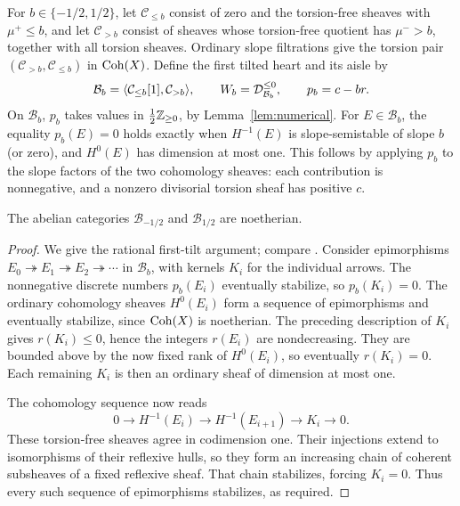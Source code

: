 For $b\in\{-1/2,1/2\}$, let $\mathcal C_{\leq b}$ consist of zero
and the torsion-free sheaves with $\mu^+\leq b$, and let
$\mathcal C_{>b}$ consist of sheaves whose torsion-free quotient has
$\mu^->b$, together with all torsion sheaves.  Ordinary slope
filtrations give the torsion pair
$(\mathcal C_{>b},\mathcal C_{\leq b})$ in $\operatorname{Coh}(X)$.  Define the
first tilted heart and its aisle by
\[
 \mathcal B_b=\langle\mathcal C_{\leq b}[1],\mathcal C_{>b}\rangle,
 \qquad W_b=\mathcal D^{\leq0}_{\mathcal B_b},
 \qquad p_b=c-br.
\]
On $\mathcal B_b$, $p_b$ takes values in $\frac12\mathbb Z_{\geq0}$, by
Lemma~\ref{lem:numerical}.  For $E\in\mathcal B_b$, the equality
$p_b(E)=0$ holds exactly when $H^{-1}(E)$ is slope-semistable of slope
$b$ (or zero), and $H^0(E)$ has dimension at most one.  This follows
by applying $p_b$ to the slope factors of the two cohomology sheaves:
each contribution is nonnegative, and a nonzero divisorial torsion
sheaf has positive $c$.

\begin{lemma}\label{lem:first-tilt-noetherian}
The abelian categories $\mathcal B_{-1/2}$ and $\mathcal B_{1/2}$ are
noetherian.
\end{lemma}

\begin{proof}
We give the rational first-tilt argument; compare
\cite[proof of Lemma~3.2.4]{BayerMacriToda2014}.
Consider epimorphisms $E_0\twoheadrightarrow E_1\twoheadrightarrow
E_2\twoheadrightarrow\cdots$ in $\mathcal B_b$, with kernels $K_i$
for the individual arrows.  The nonnegative discrete numbers
$p_b(E_i)$ eventually stabilize, so $p_b(K_i)=0$.  The ordinary
cohomology sheaves $H^0(E_i)$ form a sequence of epimorphisms and
eventually stabilize, since $\operatorname{Coh}(X)$ is noetherian.  The preceding
description of $K_i$ gives $r(K_i)\leq0$, hence the integers $r(E_i)$
are nondecreasing.  They are bounded above by the now fixed rank of
$H^0(E_i)$, so eventually $r(K_i)=0$.  Each remaining $K_i$ is then an
ordinary sheaf of dimension at most one.

The cohomology sequence now reads
\[
 0\longrightarrow H^{-1}(E_i)\longrightarrow H^{-1}(E_{i+1})
   \longrightarrow K_i\longrightarrow0.
\]
These torsion-free sheaves agree in codimension one.  Their injections
extend to isomorphisms of their reflexive hulls, so they form an
increasing chain of coherent subsheaves of a fixed reflexive sheaf.
That chain stabilizes, forcing $K_i=0$.  Thus every such sequence of
epimorphisms stabilizes, as required.
\end{proof}


